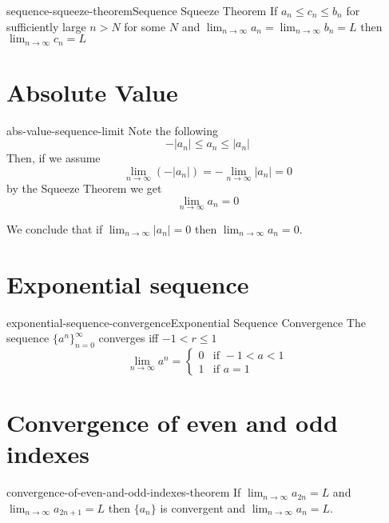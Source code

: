\documentclass[preview]{standalone}
\begin{document}
\begin{snippettheorem}{sequence-squeeze-theorem}{Sequence Squeeze Theorem}
    If \(a_n \leq c_n \leq b_n\) for sufficiently large \(n>N\) for some \(N\)
    and \(\lim_{n\to\infty}a_n =\lim_{n\to\infty}b_n=L\)
    then \(\lim_{n\to\infty} c_n =L\)
\end{snippettheorem}

\section{Absolute Value}

\begin{snippet}{abs-value-sequence-limit}
Note the following
\[
    -|a_n| \leq a_n \leq |a_n|
\]
Then, if we assume
\[
    \lim_{n\to\infty} (-|a_n|) = - \lim_{n\to\infty} |a_n| =0 
\]
by the Squeeze Theorem we get
\[
    \lim_{n\to\infty} a_n =0
\]

We conclude that if \(\lim_{n\to\infty} |a_n|=0\) then
\(\lim_{n\to\infty} a_n=0\).
\end{snippet}

\section{Exponential sequence} %

\begin{snippettheorem}{exponential-sequence-convergence}{Exponential Sequence Convergence}
    The sequence \({\{a^n\}}_{n=0}^\infty\) converges iff \(-1<r\leq 1\)
    \[
        \lim_{n\to\infty} a^n = \begin{cases}
            0 & \text{if } -1 < a < 1 \\
            1 & \text{if } a=1
        \end{cases}
    \]
\end{snippettheorem}

\section{Convergence of even and odd indexes}

\begin{snippettheorem}{convergence-of-even-and-odd-indexes-theorem}{}
    If \(\lim_{n\to\infty}a_{2n}=L\) and \(\lim_{n\to\infty}a_{2n+1}=L\)
    then \(\{a_n\}\) is convergent and \(\lim_{n\to\infty}a_n=L\).
\end{snippettheorem}
\end{document}
